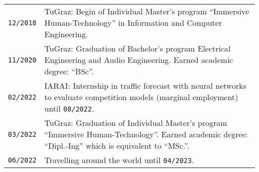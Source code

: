 {\begin{tabularx}{\columnwidth}{>{\centering\arraybackslash}p{1.5cm} | p{12cm}}
  \texttt{12/2018} & TuGraz: Begin of Individual Master's program \enquote{Immersive Human-Technology} in Information and Computer Engineering.\\
  \texttt{11/2020} & TuGraz: Graduation of Bachelor's program Electrical Engineering and Audio Engineering. Earned academic degree: \enquote{BSc}.\\
  \texttt{02/2022} & IARAI: Internship in traffic forecast with neural networks to evaluate competition models (marginal employment) until \texttt{08/2022}.\\
  \texttt{03/2022} & TuGraz: Graduation of Individual Master's program \enquote{Immersive Human-Technology}. Earned academic degree: \enquote{Dipl.-Ing} which is equivalent to \enquote{MSc.}.\\
  \texttt{06/2022} & Travelling around the world until \texttt{04/2023}.\\
\end{tabularx}
}
